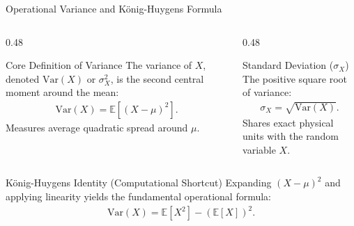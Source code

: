 \documentclass[aspectratio=169,xcolor={dvipsnames,table}]{beamer}
\begin{document}
\begin{frame}{Operational Variance and König-Huygens Formula}
	\begin{columns}[T]
		\begin{column}{0.48\textwidth}
			\begin{block}{Core Definition of Variance}
				\small
				The variance of $X$, denoted $\text{Var}(X)$ or $\sigma_X^2$, is the second central moment around the mean:
				\begin{align*}
					\text{Var}(X) = \mathbb{E}\left[ (X - \mu)^2 \right].
				\end{align*}
				Measures average quadratic spread around $\mu$.
			\end{block}
		\end{column}
		\begin{column}{0.48\textwidth}
			\begin{alertblock}{Standard Deviation ($\sigma_X$)}
				\small
				The positive square root of variance:
				\begin{align*}
					\sigma_X = \sqrt{\text{Var}(X)}.
				\end{align*}
				Shares exact physical units with the random variable $X$.
			\end{alertblock}
		\end{column}
	\end{columns}
	\vspace{-0.1cm}
	\begin{exampleblock}{König-Huygens Identity (Computational Shortcut)}
		\small
		Expanding $(X-\mu)^2$ and applying linearity yields the fundamental operational formula:
		\begin{align*}
			\text{Var}(X) = \mathbb{E}[X^2] - (\mathbb{E}[X])^2.
		\end{align*}
	\end{exampleblock}
\end{frame}
\end{document}

